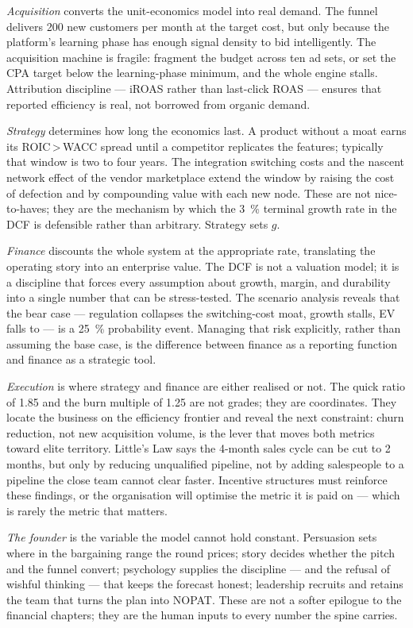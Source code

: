\emph{Acquisition} converts the unit-economics model into real demand. The funnel delivers
200 new customers per month at the target cost, but only because the platform's learning
phase has enough signal density to bid intelligently. The acquisition machine is fragile:
fragment the budget across ten ad sets, or set the CPA target below the learning-phase
minimum, and the whole engine stalls. Attribution discipline --- iROAS rather than last-click
ROAS --- ensures that reported efficiency is real, not borrowed from organic demand.

\emph{Strategy} determines how long the economics last. A product without a moat earns
its ROIC\,>\,WACC spread until a competitor replicates the features; typically that window
is two to four years. The integration switching costs and the nascent network effect of
the vendor marketplace extend the window by raising the cost of defection and by
compounding value with each new node. These are not nice-to-haves; they are the mechanism
by which the \qty{3}{\percent} terminal growth rate in the DCF is defensible rather than
arbitrary. Strategy sets $g$.

\emph{Finance} discounts the whole system at the appropriate rate, translating the
operating story into an enterprise value. The DCF is not a valuation model; it is a
discipline that forces every assumption about growth, margin, and durability into a
single number that can be stress-tested. The scenario analysis reveals that the bear case
--- regulation collapses the switching-cost moat, growth stalls, EV falls to 
--- is a \qty{25}{\percent} probability event. Managing that risk explicitly, rather than
assuming the base case, is the difference between finance as a reporting function and
finance as a strategic tool.

\emph{Execution} is where strategy and finance are either realised or not. The quick ratio
of 1.85 and the burn multiple of 1.25 are not grades; they are coordinates. They locate the
business on the efficiency frontier and reveal the next constraint: churn reduction, not
new acquisition volume, is the lever that moves both metrics toward elite territory. Little's
Law says the 4-month sales cycle can be cut to 2 months, but only by reducing unqualified
pipeline, not by adding salespeople to a pipeline the close team cannot clear faster.
Incentive structures must reinforce these findings, or the organisation will optimise the
metric it is paid on --- which is rarely the metric that matters.

\emph{The founder} is the variable the model cannot hold constant. Persuasion sets where in the
bargaining range the round prices; story decides whether the pitch and the funnel convert;
psychology supplies the discipline --- and the refusal of wishful thinking --- that keeps the
forecast honest; leadership recruits and retains the team that turns the plan into NOPAT. These
are not a softer epilogue to the financial chapters; they are the human inputs to every number
the spine carries.

